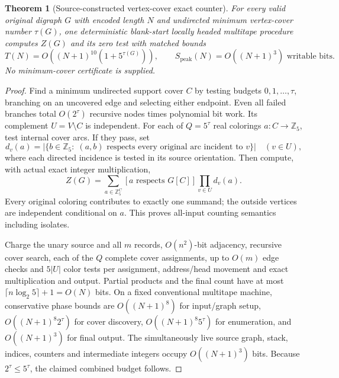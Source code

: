 \documentclass[11pt]{article}
\newtheorem{theorem}{Theorem}
\begin{document}
\begin{theorem}[Source-constructed vertex-cover exact counter]
For every valid original digraph $G$ with encoded length $N$
and undirected minimum vertex-cover number $\tau(G)$,
one deterministic blank-start locally headed multitape procedure
computes $Z(G)$ and its zero test with matched bounds
\[
T(N)=O((N+1)^{10}(1+5^{\tau(G)})),\qquad
S_{\mathrm{peak}}(N)=O((N+1)^3)\text{ writable bits}.
\]
No minimum-cover certificate is supplied.
\end{theorem}
\begin{proof}
Find a minimum undirected support cover $C$ by testing
budgets $0,1,\ldots,\tau$, branching on an uncovered edge
and selecting either endpoint. Even all failed branches total
$O(2^\tau)$ recursive nodes times polynomial bit work.
Its complement $U=V\setminus C$ is independent.
For each of $Q=5^\tau$ real colorings $a:C\to\mathbb Z_5$,
test internal cover arcs. If they pass, set
\[
d_v(a)=\left|\{b\in\mathbb Z_5:\;
(a,b)\text{ respects every original arc incident to }v\}\right|
\quad(v\in U),
\]
where each directed incidence is tested in its source orientation.
Then compute, with actual exact integer multiplication,
\[
Z(G)=\sum_{a\in\mathbb Z_5^C}
[\text{$a$ respects $G[C]$}]\prod_{v\in U}d_v(a).
\]
Every original coloring contributes to exactly one summand;
the outside vertices are independent conditional on $a$.
This proves all-input counting semantics including isolates.

Charge the unary source and all $m$ records, $O(n^2)$-bit
adjacency, recursive cover search, each of the $Q$ complete
cover assignments, up to $O(m)$ edge checks and $5|U|$
color tests per assignment, address/head movement and
exact multiplication and output. Partial products and the
final count have at most $\lceil n\log_2 5\rceil+1=O(N)$
bits. On a fixed conventional multitape machine, conservative
phase bounds are $O((N+1)^8)$ for input/graph setup,
$O((N+1)^8 2^\tau)$ for cover discovery,
$O((N+1)^8 5^\tau)$ for enumeration, and
$O((N+1)^3)$ for final output. The simultaneously live
source graph, stack, indices, counters and intermediate
integers occupy $O((N+1)^3)$ bits. Because
$2^\tau\le5^\tau$, the claimed combined budget follows.
\end{proof}
\end{document}
